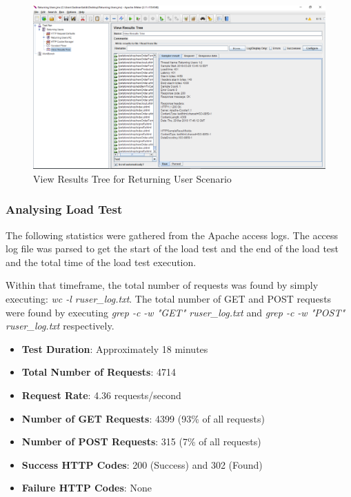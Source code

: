 \documentclass[fontsize=12pt,paper=letter,twoside]{scrartcl}
\begin{document}
\begin{figure}[!htb]
\begin{center}
\includegraphics[width=.9\textwidth]{../../load-test/test-plans/returning-user/result-tree.png}
\end{center}
\caption{View Results Tree for Returning User Scenario}
\label{fig:ruser:view_result_tree}
\end{figure}

\subsubsection{Analysing Load Test}
The following statistics were gathered from the Apache access logs. The access log file was parsed to get the start of the load test and the end of the load test and the total time of the load test execution.

\bigskip
\noindent Within that timeframe, the total number of requests was found by simply executing: \emph{wc -l ruser\_log.txt}. The total number of GET and POST requests were found by executing \emph{grep -c -w "GET" ruser\_log.txt} and \emph{grep -c -w "POST" ruser\_log.txt} respectively.

\begin{itemize}
\item \textbf{Test Duration}: Approximately 18 minutes
\item \textbf{Total Number of Requests}: 4714
\item \textbf{Request Rate}: 4.36 requests/second
\item \textbf{Number of GET Requests}: 4399 (93\% of all requests)
\item \textbf{Number of POST Requests}: 315 (7\% of all requests)
\item \textbf{Success HTTP Codes}: 200 (Success) and 302 (Found)
\item \textbf{Failure HTTP Codes}: None
\end{itemize}
\end{document}
